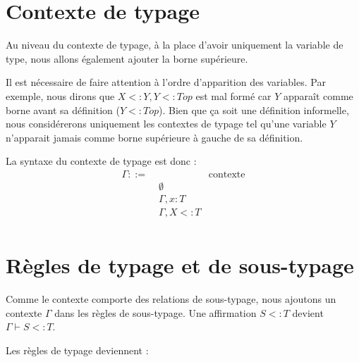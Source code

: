 \label{eval:system-f-sub}

\section{Contexte de typage}

Au niveau du contexte de typage, à la place d'avoir uniquement la variable de
type, nous allons également ajouter la borne supérieure.

Il est nécessaire de faire attention à l'ordre d'apparition des variables. Par
exemple, nous dirons que $X <: Y, Y <: Top$ est mal formé car $Y$
apparaît comme borne avant sa définition ($Y <: Top$). Bien que ça soit une
définition informelle, nous considérerons uniquement les contextes de typage
tel qu'une variable $Y$ n'apparait jamais comme borne supérieure à gauche de sa
définition.

La syntaxe du contexte de typage est donc :
\begin{align*}
  \Gamma ::= & \, & \text{contexte} \\
        & \; \emptyset & \\
        & \; \Gamma, x : T & \\
        & \; \Gamma, X <: T & \\
\end{align*}

\section{Règles de typage et de sous-typage}

Comme le contexte comporte des relations de sous-typage, nous ajoutons un
contexte $\Gamma$ dans les règles de sous-typage. Une affirmation $S <: T$
devient $\Gamma \vdash S <: T$.

Les règles de typage deviennent :

